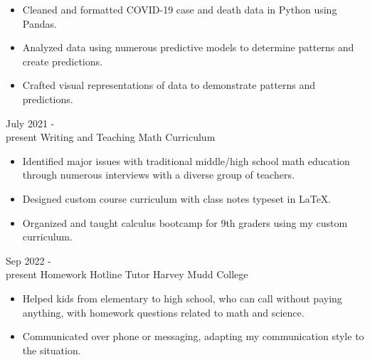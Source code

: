 \documentclass[9pt]{developercv} %
\begin{document}
\begin{entrylist}
{\begin{itemize}[noitemsep, topsep=1pt]
			\item Cleaned and formatted COVID-19 case and death data in Python using Pandas.
			\item Analyzed data using numerous predictive models to determine patterns and create predictions. 
			\item Crafted visual representations of data to demonstrate patterns and predictions. 
		\end{itemize}}
	\entry
		{July 2021 -\\present}
		{Writing and Teaching Math Curriculum}
		{}
		{\begin{itemize}[noitemsep, topsep=1pt]
			\item Identified major issues with traditional middle/high school math education through numerous
			interviews with a diverse group of teachers.
			\item Designed custom course curriculum with class notes typeset in LaTeX.
			\item Organized and taught calculus bootcamp for 9th graders using my custom curriculum.
		\end{itemize}}
\end{entrylist}

\begin{entrylist}
	\entry 
		{Sep 2022 -\\present} 
		{Homework Hotline Tutor}
		{Harvey Mudd College}
		{\begin{itemize}[noitemsep, topsep=1pt]
			\item Helped kids from elementary to high school, who can call without paying anything, with homework questions related to math and science.
			\item Communicated over phone or messaging, adapting my communication style to the situation.
		\end{itemize}}
\end{entrylist}


\end{document}
